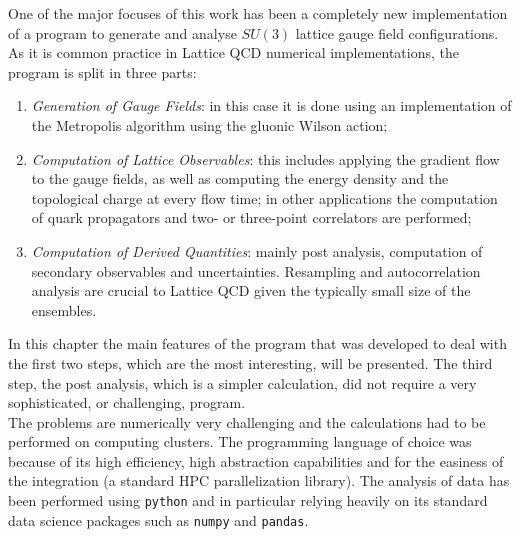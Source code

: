 One of the major focuses of this work has been a completely new implementation of a program to generate and analyse $SU(3)$ lattice gauge field configurations. As it is common practice in Lattice QCD numerical implementations, the program is split in three parts:
\begin{enumerate}
    \item \textit{Generation of Gauge Fields}: in this case it is done using an implementation of the Metropolis algorithm using the gluonic Wilson action;
    \item \textit{Computation of Lattice Observables}: this includes applying the gradient flow to the gauge fields, as well as computing the energy density and the topological charge at every flow time; in other applications the computation of quark propagators and two- or three-point correlators are performed; 
    \item \textit{Computation of Derived Quantities}: mainly post analysis, computation of secondary observables and uncertainties. Resampling and autocorrelation analysis are crucial to Lattice QCD given the typically small size of the ensembles. 
\end{enumerate}
In this chapter the main features of the program that was developed to deal with the first two steps, which are the most interesting, will be presented. The third step, the post analysis, which is a simpler calculation, did not require a very sophisticated, or challenging, program. \\
The problems are numerically very challenging and the calculations had to be performed on computing clusters. The programming language of choice was \cpp because of its high efficiency, high abstraction capabilities and for the easiness of the \mpi integration (a standard HPC parallelization library). The analysis of data has been performed using \texttt{python} and in particular relying heavily on its standard data science packages such as \texttt{numpy} and \texttt{pandas}.
  
